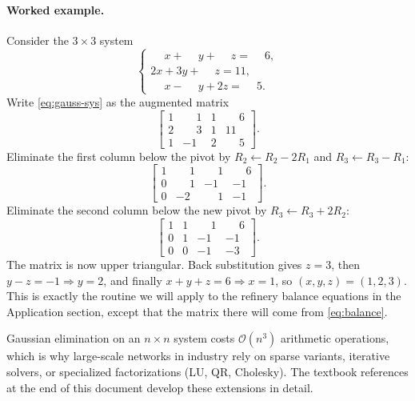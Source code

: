 \documentclass[11pt,a4paper]{article}
\begin{document}
\paragraph{Worked example.}
Consider the $3 \times 3$ system
\begin{equation}
  \begin{cases}
    \phantom{-}x + \phantom{-}y + \phantom{-}z = \phantom{-}6, \\
    2x + 3y + \phantom{-}z = 11, \\
    \phantom{-}x - \phantom{-}y + 2z = \phantom{-}5.
  \end{cases}
  \label{eq:gauss-sys}
\end{equation}
Write \eqref{eq:gauss-sys} as the augmented matrix
\[
\left[\begin{array}{ccc|c}
1 & \phantom{-}1 & 1 & \phantom{-}6 \\
2 & \phantom{-}3 & 1 & 11 \\
1 & -1 & 2 & \phantom{-}5
\end{array}\right].
\]
Eliminate the first column below the pivot by
$R_2 \gets R_2 - 2R_1$ and $R_3 \gets R_3 - R_1$:
\[
\left[\begin{array}{ccc|c}
1 & \phantom{-}1 & \phantom{-}1 & \phantom{-}6 \\
0 & \phantom{-}1 & -1 & -1 \\
0 & -2 & \phantom{-}1 & -1
\end{array}\right].
\]
Eliminate the second column below the new pivot by
$R_3 \gets R_3 + 2R_2$:
\[
\left[\begin{array}{ccc|c}
1 & 1 & \phantom{-}1 & \phantom{-}6 \\
0 & 1 & -1 & -1 \\
0 & 0 & -1 & -3
\end{array}\right].
\]
The matrix is now upper triangular. Back substitution gives
$z = 3$, then $y - z = -1 \Rightarrow y = 2$, and finally
$x + y + z = 6 \Rightarrow x = 1$, so
$(x, y, z) = (1, 2, 3)$. This is exactly the routine we will apply to
the refinery balance equations in the Application section, except that
the matrix there will come from \eqref{eq:balance}.

Gaussian elimination on an $n \times n$ system costs $\mathcal{O}(n^3)$
arithmetic operations, which is why large-scale networks in industry
rely on sparse variants, iterative solvers, or specialized factorizations
(LU, QR, Cholesky). The textbook references at the end of this document
develop these extensions in detail.

\end{document}

